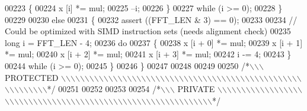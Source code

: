 \begin{DoxyCode}
00223         \{
00224             x [i] *= mul;
00225             --i;
00226         \}
00227         \textcolor{keywordflow}{while} (i >= 0);
00228     \}
00229 
00230     \textcolor{keywordflow}{else}
00231     \{
00232         assert ((FFT\_LEN & 3) == 0);
00233 
00234         \textcolor{comment}{// Could be optimized with SIMD instruction sets (needs alignment check)}
00235         \textcolor{keywordtype}{long}                i = FFT\_LEN - 4;
00236         \textcolor{keywordflow}{do}
00237         \{
00238             x [i + 0] *= mul;
00239             x [i + 1] *= mul;
00240             x [i + 2] *= mul;
00241             x [i + 3] *= mul;
00242             i -= 4;
00243         \}
00244         \textcolor{keywordflow}{while} (i >= 0);
00245     \}
00246 \}
00247 
00248 
00249 
00250 \textcolor{comment}{/*\(\backslash\)\(\backslash\)\(\backslash\) PROTECTED \(\backslash\)\(\backslash\)\(\backslash\)\(\backslash\)\(\backslash\)\(\backslash\)\(\backslash\)\(\backslash\)\(\backslash\)\(\backslash\)\(\backslash\)\(\backslash\)\(\backslash\)\(\backslash\)\(\backslash\)\(\backslash\)\(\backslash\)\(\backslash\)\(\backslash\)\(\backslash\)\(\backslash\)\(\backslash\)\(\backslash\)\(\backslash\)\(\backslash\)\(\backslash\)\(\backslash\)\(\backslash\)\(\backslash\)\(\backslash\)\(\backslash\)\(\backslash\)\(\backslash\)\(\backslash\)\(\backslash\)\(\backslash\)\(\backslash\)\(\backslash\)\(\backslash\)\(\backslash\)\(\backslash\)\(\backslash\)\(\backslash\)\(\backslash\)\(\backslash\)\(\backslash\)\(\backslash\)\(\backslash\)\(\backslash\)\(\backslash\)\(\backslash\)\(\backslash\)\(\backslash\)\(\backslash\)\(\backslash\)\(\backslash\)\(\backslash\)\(\backslash\)\(\backslash\)\(\backslash\)*/}
00251 
00252 
00253 
00254 \textcolor{comment}{/*\(\backslash\)\(\backslash\)\(\backslash\) PRIVATE \(\backslash\)\(\backslash\)\(\backslash\)\(\backslash\)\(\backslash\)\(\backslash\)\(\backslash\)\(\backslash\)\(\backslash\)\(\backslash\)\(\backslash\)\(\backslash\)\(\backslash\)\(\backslash\)\(\backslash\)\(\backslash\)\(\backslash\)\(\backslash\)\(\backslash\)\(\backslash\)\(\backslash\)\(\backslash\)\(\backslash\)\(\backslash\)\(\backslash\)\(\backslash\)\(\backslash\)\(\backslash\)\(\backslash\)\(\backslash\)\(\backslash\)\(\backslash\)\(\backslash\)\(\backslash\)\(\backslash\)\(\backslash\)\(\backslash\)\(\backslash\)\(\backslash\)\(\backslash\)\(\backslash\)\(\backslash\)\(\backslash\)\(\backslash\)\(\backslash\)\(\backslash\)\(\backslash\)\(\backslash\)\(\backslash\)\(\backslash\)\(\backslash\)\(\backslash\)\(\backslash\)\(\backslash\)\(\backslash\)\(\backslash\)\(\backslash\)\(\backslash\)\(\backslash\)\(\backslash\)\(\backslash\)\(\backslash\)*/}

\end{DoxyCode}
